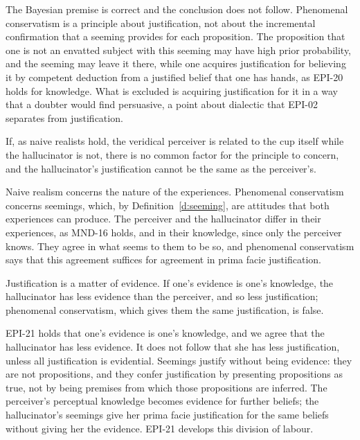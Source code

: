 \documentclass{situationist-preprint}
\begin{document}
\begin{reply}
The Bayesian premise is correct and the conclusion does not follow. Phenomenal conservatism is a principle about justification, not about the incremental confirmation that a seeming provides for each proposition. The proposition that one is not an envatted subject with this seeming may have high prior probability, and the seeming may leave it there, while one acquires justification for believing it by competent deduction from a justified belief that one has hands, as EPI-20 holds for knowledge. What is excluded is acquiring justification for it in a way that a doubter would find persuasive, a point about dialectic that EPI-02 separates from justification.
\end{reply}

\begin{objection}[Disjunctivism]
If, as naive realists hold, the veridical perceiver is related to the cup itself while the hallucinator is not, there is no common factor for the principle to concern, and the hallucinator's justification cannot be the same as the perceiver's.
\end{objection}

\begin{reply}
Naive realism concerns the nature of the experiences. Phenomenal conservatism concerns seemings, which, by Definition~\ref{d:seeming}, are attitudes that both experiences can produce. The perceiver and the hallucinator differ in their experiences, as MND-16 holds, and in their knowledge, since only the perceiver knows. They agree in what seems to them to be so, and phenomenal conservatism says that this agreement suffices for agreement in prima facie justification.
\end{reply}

\begin{objection}[Evidence]
Justification is a matter of evidence. If one's evidence is one's knowledge, the hallucinator has less evidence than the perceiver, and so less justification; phenomenal conservatism, which gives them the same justification, is false.
\end{objection}

\begin{reply}
EPI-21 holds that one's evidence is one's knowledge, and we agree that the hallucinator has less evidence. It does not follow that she has less justification, unless all justification is evidential. Seemings justify without being evidence: they are not propositions, and they confer justification by presenting propositions as true, not by being premises from which those propositions are inferred. The perceiver's perceptual knowledge becomes evidence for further beliefs; the hallucinator's seemings give her prima facie justification for the same beliefs without giving her the evidence. EPI-21 develops this division of labour.
\end{reply}
\end{document}
